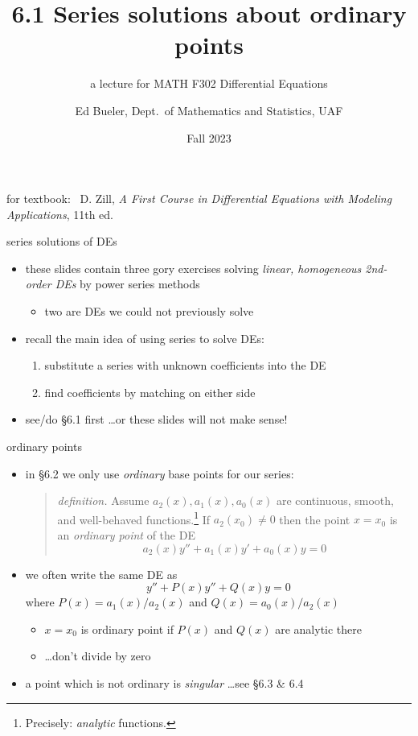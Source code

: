 \documentclass[dvipsnames,colorlinks]{beamer}
\title{6.1 Series solutions about ordinary points}
\subtitle{a lecture for MATH F302 Differential Equations}
\author{Ed Bueler, Dept.~of Mathematics and Statistics, UAF}
\date{Fall 2023}
\begin{document}


\begin{frame}
\titlepage

\centerline{\tiny for textbook: \, D. Zill, \emph{A First Course in Differential Equations with Modeling Applications}, 11th ed.}
\end{frame}

\begin{frame}{series solutions of DEs}

\begin{itemize}
\item these slides contain \alert{three gory exercises} solving \emph{linear, homogeneous 2nd-order DEs} by power series methods
    \begin{itemize}
    \item two are DEs we could not previously solve
    \end{itemize}
\item recall the main idea of using series to solve DEs:

\medskip
\begin{enumerate}
\item substitute a series with unknown coefficients into the DE
\item find coefficients by matching on either side
\end{enumerate}

\medskip
\item see/do \S6.1 first \dots or these slides will not make sense!
\end{itemize}
\end{frame}


\begin{frame}{ordinary points}

\begin{itemize}
\item in \S6.2 we only use \emph{ordinary} base points for our series:

\medskip
\begin{quote}\normalfont
\emph{definition.}  Assume $a_2(x),a_1(x),a_0(x)$ are continuous, smooth, and well-behaved functions.\footnote{Precisely: \emph{analytic} functions.}  If $a_2(x_0)\ne 0$ then the point $x=x_0$ is an \emph{ordinary point} of the DE
    $$a_2(x) y'' + a_1(x) y' + a_0(x) y = 0$$
\end{quote}

\item we often write the same DE as
    $$y'' + P(x) y'' + Q(x) y = 0$$
where $P(x)=a_1(x)/a_2(x)$ and $Q(x)=a_0(x)/a_2(x)$
    \begin{itemize}
    \item $x=x_0$ is ordinary point if $P(x)$ and $Q(x)$ are analytic there
    \item \dots don't divide by zero
    \end{itemize}
\item a point which is not ordinary is \emph{singular} \dots see \S 6.3 \& 6.4

\bigskip
\end{itemize}
\end{frame}
\end{document}
